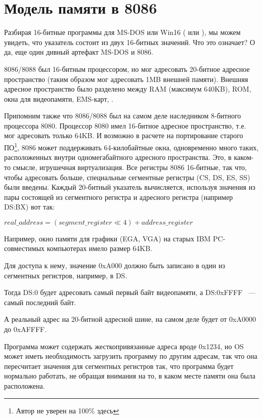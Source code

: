 \section{Модель памяти в 8086}
\label{8086_memory_model}

Разбирая 16-битные программы для MS-DOS или Win16
( или ),
мы можем увидеть, что указатель состоит из двух 16-битных значений.
Что это означает? О да, еще один дивный артефакт MS-DOS и 8086.

8086/8088 был 16-битным процессором, но мог адресовать 20-битное адресное
пространство (таким образом мог адресовать 1MB внешней памяти).
Внешняя адресное пространство было разделено между \ac{RAM} (максимум 640KB),
\ac{ROM}, окна для видеопамяти, EMS-карт, \etc{}.

Припомним также что 8086/8088 был на самом деле наследником 8-битного процессора 8080.
Процессор 8080 имел 16-битное адресное пространство, т.е. мог адресовать только 64KB.
И возможно в расчете на портирование старого ПО\footnote{Автор не уверен на 100\% здесь},
8086 может поддерживать 64-килобайтные
окна, одновременно много таких, расположенных внутри одномегабайтного адресного пространства.
Это, в каком-то смысле, игрушечная виртуализация.
Все регистры 8086 16-битные, так что, чтобы адресовать больше, специальные сегментные
регистры (CS, DS, ES, SS) были введены.
Каждый 20-битный указатель вычисляется, используя значения из пары состоящей из сегментного регистра
и адресного регистра (например DS:BX) вот так:

\begin{center}
$real\_address = (segment\_register \ll 4) + address\_register$
\end{center}

Например, окно памяти для графики (\ac{EGA}, \ac{VGA}) на старых IBM PC-совместимых компьютерах
имело размер 64KB.

Для доступа к нему, значение 0xA000 должно быть записано в один из сегментных регистров,
например, в DS.

Тогда DS:0 будет адресовать самый первый байт видеопамяти, а DS:0xFFFF ~--- самый последний байт.

А реальный адрес на 20-битной адресной шине, на самом деле будет от 0xA0000 до 0xAFFFF.

Программа может содержать жесткопривязанные адреса вроде 0x1234, но \ac{OS} может иметь необходимость
загрузить программу по другим адресам, так что она пересчитает значения для сегментных регистров так,
что программа будет нормально работать, не обращая внимания на то,
в каком месте памяти она была расположена.

